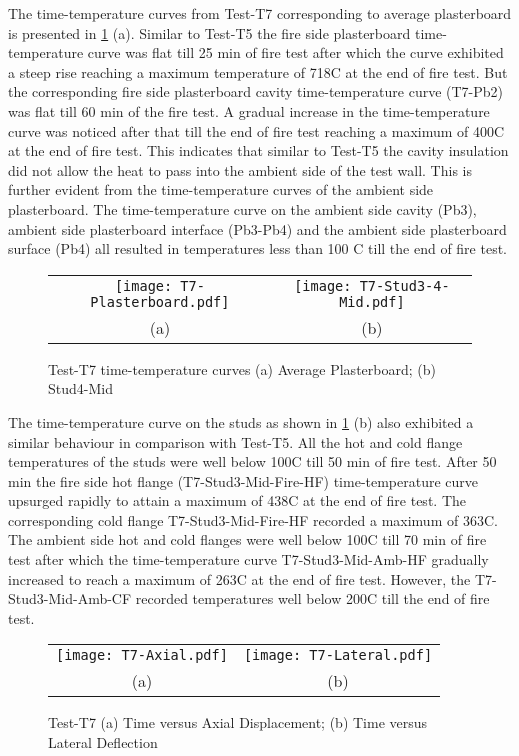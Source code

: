 The time-temperature curves from Test-T7 corresponding to average plasterboard is presented in \cref{fig:T7-time-temperature} (a). Similar to Test-T5 the fire side plasterboard time-temperature curve was flat till 25 min of fire test after which the curve exhibited a steep rise reaching a maximum temperature of 718\degree C at the end of fire test. But the corresponding fire side plasterboard cavity time-temperature curve (T7-Pb2) was flat till 60 min of the fire test. A gradual increase in the time-temperature curve was noticed after that till the end of fire test reaching a maximum of 400\degree C at the end of fire test. This indicates that similar to Test-T5 the cavity insulation did not allow the heat to pass into the ambient side of the test wall. This is further evident from the time-temperature curves of the ambient side plasterboard. The time-temperature curve on the ambient side cavity (Pb3), ambient side plasterboard interface (Pb3-Pb4) and the ambient side plasterboard surface (Pb4) all resulted in temperatures less than 100 \degree C till the end of fire test.
\begin{figure}[!htbp]
	\centering	
		\begin{tabular}{cc}
			\texttt{[image: T7-Plasterboard.pdf]} & \texttt{[image: T7-Stud3-4-Mid.pdf]} \\
			(a) & (b) \\
			\end{tabular}
		\caption{Test-T7 time-temperature curves (a) Average Plasterboard; (b) Stud4-Mid}
		\label{fig:T7-time-temperature}
\end{figure}

The time-temperature curve on the studs as shown in \cref{fig:T7-time-temperature} (b) also exhibited a similar behaviour in comparison with Test-T5. All the hot and cold flange temperatures of the studs were well below 100\degree C till 50 min of fire test. After 50 min the fire side hot flange (T7-Stud3-Mid-Fire-HF) time-temperature curve upsurged rapidly to attain a maximum of 438\degree C at the end of fire test. The corresponding cold flange T7-Stud3-Mid-Fire-HF recorded a maximum of 363\degree C. The ambient side hot and cold flanges were well below 100\degree C till 70 min of fire test after which the time-temperature curve T7-Stud3-Mid-Amb-HF gradually increased to reach a maximum of 263\degree C at the end of fire test. However, the T7-Stud3-Mid-Amb-CF recorded temperatures well below 200\degree C till the end of fire test.  
\begin{figure}[!htbp]
	\centering	
		\begin{tabular}{cc}
			\texttt{[image: T7-Axial.pdf]} & \texttt{[image: T7-Lateral.pdf]} \\
			(a) & (b) \\
			\end{tabular}
		\caption{Test-T7 (a) Time versus Axial Displacement; (b) Time versus Lateral Deflection}
		\label{fig:T7-displacement}
\end{figure}

